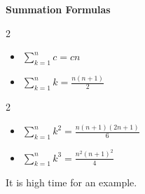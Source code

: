 \documentclass{ximera}
\begin{document}
\begin{center}


\centerline{\textbf{Summation Formulas}}

\medskip

\begin{multicols}{2}
\begin{itemize}

\item  $\displaystyle{\sum_{k=1}^{n} c = c n}$

\item $\displaystyle{\sum_{k=1}^{n} k = \frac{n(n+1)}{2}}$

\end{itemize}

\end{multicols}

\begin{multicols}{2}
\begin{itemize}


\item $\displaystyle{\sum_{k=1}^{n} k^2 = \frac{n(n+1)(2n+1)}{6}}$

\item  $\displaystyle{\sum_{k=1}^{n} k^3 = \frac{n^2(n+1)^2}{4}}$

\end{itemize}

\end{multicols}

 


\end{center}

It is high time for an example.
\end{document}
